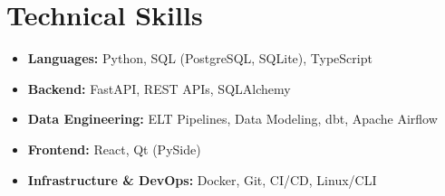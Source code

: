 
\section{Technical Skills}
\begin{itemize}[leftmargin=0in, label={}, itemsep=2pt]
    \item \textbf{Languages:} Python, SQL (PostgreSQL, SQLite), TypeScript
    \item \textbf{Backend:} FastAPI, REST APIs, SQLAlchemy
    \item \textbf{Data Engineering:} ELT Pipelines, Data Modeling, dbt, Apache Airflow
    \item \textbf{Frontend:} React, Qt (PySide)
    \item \textbf{Infrastructure \& DevOps:} Docker, Git, CI/CD, Linux/CLI
\end{itemize}
